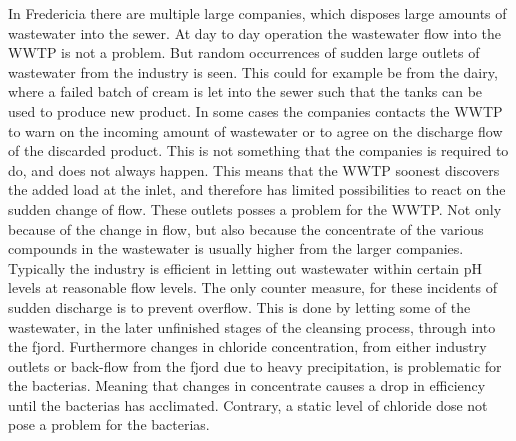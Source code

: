 In Fredericia there are multiple large companies, which disposes large amounts of wastewater into the sewer. At day to day operation the wastewater flow into the WWTP is not a problem. But random occurrences of sudden large outlets of wastewater from the industry is seen. This could for example be from the dairy, where a failed batch of cream is let into the sewer such that the tanks can be used to produce new product. In some cases the companies contacts the WWTP to warn on the incoming amount of wastewater or to agree on the discharge flow of the discarded product. This is not something that the companies is required to do, and does not always happen. This means that the WWTP soonest discovers the added load at the inlet, and therefore has limited possibilities to react on the sudden change of flow.
These outlets posses a problem for the WWTP. Not only because of the change in flow, but also because the concentrate of the various compounds in the wastewater is usually higher from the larger companies. Typically the industry is efficient in letting out wastewater within certain pH levels at reasonable flow levels. The only counter measure, for these incidents of sudden discharge is to prevent overflow. This is done by letting some of the wastewater, in the later unfinished stages of the cleansing process, through into the fjord. Furthermore changes in chloride concentration, from either industry outlets or back-flow from the fjord due to heavy precipitation, is problematic for the bacterias. Meaning that changes in concentrate causes a drop in efficiency until the bacterias has acclimated. Contrary, a static level of chloride dose not pose a problem for the bacterias. 

